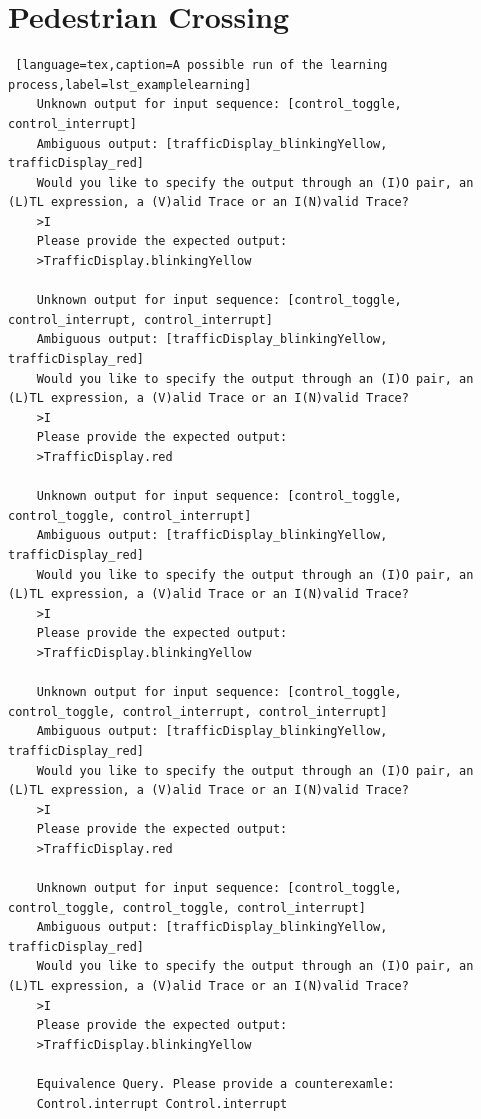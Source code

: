 \clearpage\section{Pedestrian Crossing}
\bigskip
\begin{lstlisting} [language=tex,caption=A possible run of the learning process,label=lst_examplelearning]
	Unknown output for input sequence: [control_toggle, control_interrupt]
	Ambiguous output: [trafficDisplay_blinkingYellow, trafficDisplay_red]
	Would you like to specify the output through an (I)O pair, an (L)TL expression, a (V)alid Trace or an I(N)valid Trace?
	>I
	Please provide the expected output:
	>TrafficDisplay.blinkingYellow
	
	Unknown output for input sequence: [control_toggle, control_interrupt, control_interrupt]
	Ambiguous output: [trafficDisplay_blinkingYellow, trafficDisplay_red]
	Would you like to specify the output through an (I)O pair, an (L)TL expression, a (V)alid Trace or an I(N)valid Trace?
	>I
	Please provide the expected output:
	>TrafficDisplay.red
	
	Unknown output for input sequence: [control_toggle, control_toggle, control_interrupt]
	Ambiguous output: [trafficDisplay_blinkingYellow, trafficDisplay_red]
	Would you like to specify the output through an (I)O pair, an (L)TL expression, a (V)alid Trace or an I(N)valid Trace?
	>I
	Please provide the expected output:
	>TrafficDisplay.blinkingYellow
	
	Unknown output for input sequence: [control_toggle, control_toggle, control_interrupt, control_interrupt]
	Ambiguous output: [trafficDisplay_blinkingYellow, trafficDisplay_red]
	Would you like to specify the output through an (I)O pair, an (L)TL expression, a (V)alid Trace or an I(N)valid Trace?
	>I
	Please provide the expected output:
	>TrafficDisplay.red
	
	Unknown output for input sequence: [control_toggle, control_toggle, control_toggle, control_interrupt]
	Ambiguous output: [trafficDisplay_blinkingYellow, trafficDisplay_red]
	Would you like to specify the output through an (I)O pair, an (L)TL expression, a (V)alid Trace or an I(N)valid Trace?
	>I
	Please provide the expected output:
	>TrafficDisplay.blinkingYellow
	
	Equivalence Query. Please provide a counterexamle:
	Control.interrupt Control.interrupt
	

\end{lstlisting}

